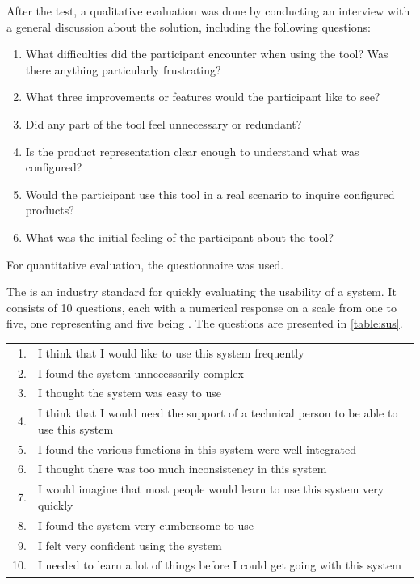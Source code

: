 After the test, a qualitative evaluation was done by conducting an interview with a general discussion about the solution, including the following questions:
\begin{enumerate}
    \item What difficulties did the participant encounter when using the tool? Was there anything particularly frustrating?
    \item What three improvements or features would the participant like to see?
    \item Did any part of the tool feel unnecessary or redundant?
    \item Is the product representation clear enough to understand what was configured?
    \item Would the participant use this tool in a real scenario to inquire configured products?
    \item What was the initial feeling of the participant about the tool?
\end{enumerate}

For quantitative evaluation, the  questionnaire was used.

The  is an industry standard for quickly evaluating the usability of a system. It consists of 10 questions, each with a numerical response on a scale from one to five, one representing  and five being . The questions are presented in \autoref{table:sus}.~\cite{Sus}

\begin{table}[htb]
\centering
\begin{tabular}{r>{\raggedright\arraybackslash}p{11.5cm}}
\toprule
1. & I think that I would like to use this system frequently \\
2. & I found the system unnecessarily complex \\
3. & I thought the system was easy to use \\
4. & I think that I would need the support of a technical person to be able to use this system \\
5. & I found the various functions in this system were well integrated \\
6. & I thought there was too much inconsistency in this system \\
7. & I would imagine that most people would learn to use this system very quickly \\
8. & I found the system very cumbersome to use \\
9. & I felt very confident using the system \\
10. &  I needed to learn a lot of things before I could get going with this system \\
\bottomrule
\end{tabular}
\label{table:sus}
\end{table}

